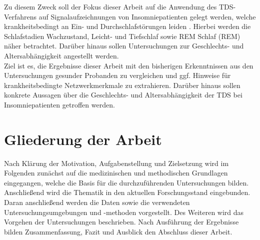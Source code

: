 \newpage

Zu diesem Zweck soll der Fokus dieser Arbeit auf die Anwendung des \acs{TDS}-Verfahrens auf Signalaufzeichnungen von Insomniepatienten gelegt werden, welche krankheitsbedingt an Ein- und Durchschlafstörungen leiden \parencite{mayer_s3-leitlinie_2009}. Hierbei werden die Schlafstadien Wachzustand, Leicht- und Tiefschlaf sowie \acl{REM} Schlaf (\acs{REM}) näher betrachtet. Darüber hinaus sollen Untersuchungen zur Geschlechts- und Altersabhängigkeit angestellt werden.\\

Ziel ist es, die Ergebnisse dieser Arbeit mit den bisherigen Erkenntnissen aus den Untersuchungen gesunder Probanden zu vergleichen und ggf. Hinweise für krankheitsbedingte Netzwerkmerkmale zu extrahieren. Darüber hinaus sollen konkrete Aussagen über die Geschlechts- und Altersabhängigkeit der \acs{TDS} bei Insomniepatienten getroffen werden. 

\section{Gliederung der Arbeit}

Nach Klärung der Motivation, Aufgabenstellung und Zielsetzung wird im Folgenden zunächst auf die medizinischen und methodischen Grundlagen eingegangen, welche die Basis für die durchzuführenden Untersuchungen bilden. Anschließend wird die Thematik in den aktuellen Forschungsstand eingebunden. Daran anschließend werden die Daten sowie die verwendeten Untersuchungsumgebungen und -methoden vorgestellt. Des Weiteren wird das Vorgehen der Untersuchungen beschrieben. Nach Ausführung der Ergebnisse bilden Zusammenfassung, Fazit und Ausblick den Abschluss dieser Arbeit. 